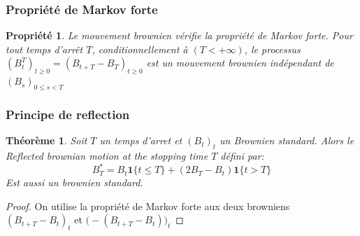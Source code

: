 \documentclass[a4paper]{article}
\newtheorem{theorem}{Théorème}[section]
\newtheorem{propriete}{Propriété}[theorem]
\newtheorem{proof}{Démonstration}
\begin{document}
\subsubsection{Propriété de Markov forte}
\begin{propriete}
     Le mouvement brownien vérifie la propriété de Markov forte. Pour tout temps d'arrêt $T$, conditionnellement à $(T<+\infty)$, le processus $(B_t ^T)_{t\geq 0} = (B_{t+T}-B_T)_{t\geq 0}$ est un mouvement brownien indépendant de $(B_s)_{0\leq s<T}$
\end{propriete}
\subsubsection{Principe de reflection}
\begin{theorem}
    Soit $T$ un temps d'arret et $(B_t)_t$ un Brownien standard. Alors le \textit{Reflected brownian motion at the stopping time $T$} défini par:
    \begin{equation*}
         B_T^* = B_t \textbf{1}\{ t \leq T \} + (2B_T-B_t) \textbf{1} \{ t > T \}
    \end{equation*}
    Est aussi un brownien standard. \\
\end{theorem} 
\begin{proof}
    On utilise la propriété de Markov forte aux deux browniens $(B_{t+T} - B_t)_t$ et $\bigg(-(B_{t+T} - B_t)\bigg)_t$     
\end{proof} 
\vspace{1mm}
\end{document}
